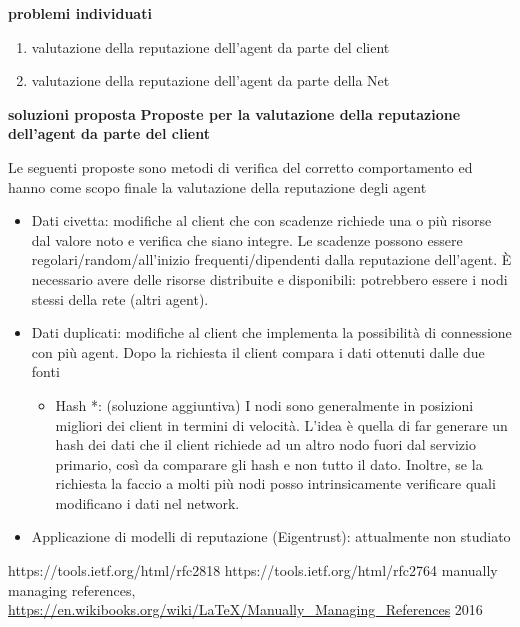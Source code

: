 \documentclass[]{article}
\begin{document}
	\textbf{problemi individuati}
	\begin{enumerate}
		\item valutazione della reputazione dell'agent da parte del client
		\item valutazione della reputazione dell'agent da parte della Net
	\end{enumerate}
	
	\textbf{soluzioni proposta}
	\textbf{Proposte per la valutazione della reputazione dell'agent da parte del client}
	
	Le seguenti proposte sono metodi di verifica del corretto comportamento ed hanno come scopo finale la valutazione della reputazione degli agent
	\begin{itemize}
		\item Dati civetta: modifiche al client che con scadenze richiede una o più risorse dal valore noto e verifica che siano integre. Le scadenze possono essere regolari/random/all’inizio frequenti/dipendenti dalla reputazione dell’agent. È necessario avere delle risorse distribuite e disponibili: potrebbero essere i nodi stessi della rete (altri agent).
		\item Dati duplicati: modifiche al client che implementa la possibilità di connessione con più agent. Dopo la richiesta il client compara i dati ottenuti dalle due fonti
		\begin{itemize}
			\item Hash *: (soluzione aggiuntiva) I nodi sono generalmente in posizioni migliori dei client in termini di velocità. L’idea è quella di far generare un hash dei dati che il client richiede ad un altro nodo fuori dal servizio primario, così da comparare gli hash e non tutto il dato.
			Inoltre, se la richiesta la faccio a molti più nodi posso intrinsicamente verificare quali modificano i dati nel network.
		\end{itemize}
		\item Applicazione di modelli di reputazione (Eigentrust): attualmente non studiato
	\end{itemize}

	
	\begin{thebibliography}{1}
			https://tools.ietf.org/html/rfc2818
			https://tools.ietf.org/html/rfc2764
			manually managing references, 
			\url{https://en.wikibooks.org/wiki/LaTeX/Manually_Managing_References}
			2016
	\end{thebibliography}
		
	\pagebreak
	
	
\end{document}
